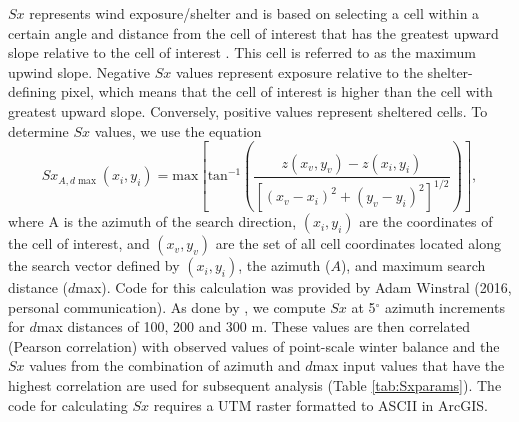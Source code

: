 \documentclass{sfuthesis}
\begin{document}
$Sx$ represents wind exposure/shelter and is based on selecting a cell within a certain angle and distance from the cell of interest that has the greatest upward slope relative to the cell of interest \citep{Winstral2002}. This cell is referred to as the maximum upwind slope. Negative $Sx$ values represent exposure relative to the shelter-defining pixel, which means that the cell of interest is higher than the cell with greatest upward slope. Conversely, positive values represent sheltered cells. To determine $Sx$ values, we use the equation
\begin{equation}
Sx_{A, d\max}(x_i, y_i) = \textrm{max} \left[ \textrm{tan}^{-1} \left( \frac{z(x_v,y_v)-z(x_i,y_i)}{[(x_v-x_i)^2+(y_v-y_i)^2]^{1/2}} \right) \right] ,
\end{equation}
where A is the azimuth of the search direction, $(x_i, y_i)$ are the coordinates of the cell of interest, and $(x_v, y_v)$ are the set of all cell coordinates located along the search vector defined by	$(x_i, y_i)$, the azimuth ($A$), and maximum search distance ($d$max). Code for this calculation was provided by Adam Winstral (2016, personal communication). As done by \cite{McGrath2015}, we compute $Sx$ at 5$^{\circ}$ azimuth increments for $d$max distances of 100, 200 and 300 m. These values are then correlated (Pearson correlation) with observed values of point-scale winter balance and the $Sx$ values from the combination of azimuth and $d$max input values that have the highest correlation are used for subsequent analysis (Table \ref{tab:Sxparams}). The code for calculating $Sx$ requires a UTM raster formatted to ASCII in ArcGIS. 
\end{document}

